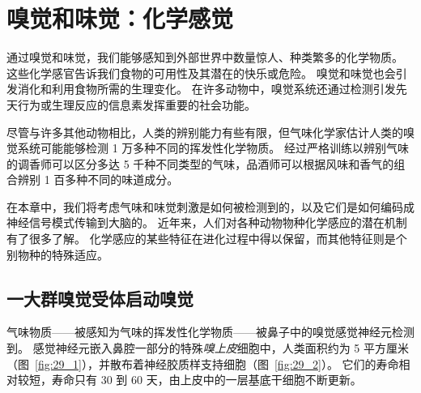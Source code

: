 \chapter{嗅觉和味觉：化学感觉} \label{chap:chap29}

通过嗅觉和味觉，我们能够感知到外部世界中数量惊人、种类繁多的化学物质。
这些化学感官告诉我们食物的可用性及其潜在的快乐或危险。
嗅觉和味觉也会引发消化和利用食物所需的生理变化。
在许多动物中，嗅觉系统还通过检测引发先天行为或生理反应的信息素发挥重要的社会功能。


尽管与许多其他动物相比，人类的辨别能力有些有限，但气味化学家估计人类的嗅觉系统可能能够检测 1 万多种不同的挥发性化学物质。
经过严格训练以辨别气味的调香师可以区分多达 5 千种不同类型的气味，品酒师可以根据风味和香气的组合辨别 1 百多种不同的味道成分。


在本章中，我们将考虑气味和味觉刺激是如何被检测到的，以及它们是如何编码成神经信号模式传输到大脑的。
近年来，人们对各种动物物种化学感应的潜在机制有了很多了解。
化学感应的某些特征在进化过程中得以保留，而其他特征则是个别物种的特殊适应。



\section{一大群嗅觉受体启动嗅觉}

气味物质——被感知为气味的挥发性化学物质——被鼻子中的嗅觉感觉神经元检测到。
感觉神经元嵌入鼻腔一部分的特殊\textit{嗅上皮}细胞中，人类面积约为 5 平方厘米（图~\ref{fig:29_1}），并散布着神经胶质样支持细胞（图~\ref{fig:29_2}）。
它们的寿命相对较短，寿命只有 30 到 60 天，由上皮中的一层基底干细胞不断更新。


